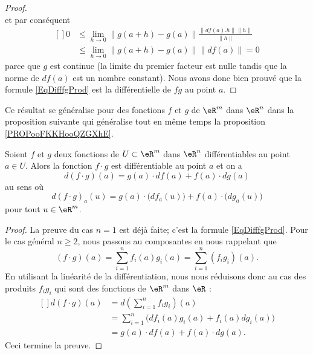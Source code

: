 \begin{proof}
\begin{equation}
	\end{equation}
	et par conséquent
	\begin{equation}
		\begin{aligned}[]
			0 & \leq\lim_{h\to 0} \| g(a+h)-g(a) \|\frac{ \| df(a).h \|\| h \| }{ \| h \| } \\
			  & \leq \lim_{h\to 0} \| g(a+h)-g(a) \|\| df(a) \|=0
		\end{aligned}
	\end{equation}
	parce que \( g\) est continue (la limite du premier facteur est nulle tandis que la norme de \( df(a)\) est un nombre constant). Nous avons donc bien prouvé que la formule \eqref{EqDifffgProd} est la différentielle de \( fg\) au point \( a\).
\end{proof}


Ce résultat se généralise pour des fonctions \( f\) et \( g\) de \( \eR^m\) dans \( \eR^n\) dans la proposition suivante qui généralise tout en même temps la proposition \ref{PROPooFKKHooQZGXhE}.
\begin{proposition}
	Soient \( f\) et \( g\) deux fonctions de \( U\subset\eR^m\) dans \( \eR^n\) différentiables au point \( a\in U\). Alors la fonction \( f\cdot g\) est différentiable  au point \( a\) et on a
	\begin{equation}
		d(f\cdot g)(a)=g(a)\cdot df(a)+f(a)\cdot dg(a)
	\end{equation}
	au sens où
	\begin{equation}		\label{Eqdfcdotgexpl}
		d(f\cdot g)_a(u)=g(a)\cdot\big( df_a(u) \big)+f(a)\cdot\big( dg_a(u) \big)
	\end{equation}
	pour tout \( u\in\eR^m\).
\end{proposition}

\begin{proof}
	La preuve du cas \( n=1\) est déjà faite; c'est la formule \eqref{EqDifffgProd}. Pour le cas général \( n\geq 2\), nous passons au composantes en nous rappelant que
	\begin{equation}
		(f\cdot g)(a)=\sum_{i=1}^nf_i(a)g_i(a)=\sum_{i=1}^n(f_ig_i)(a).
	\end{equation}
	En utilisant la linéarité de la différentiation, nous nous réduisons donc au cas des produits \( f_ig_i\) qui sont des fonctions de \( \eR^m\) dans \( \eR\) :
	\begin{equation}
		\begin{aligned}[]
			d(f\cdot g)(a) & =d\left( \sum_{i=1}^n f_ig_i \right)(a)              \\
			               & =\sum_{i=1}^n\big( df_i(a)g_i(a)+f_i(a)dg_i(a) \big) \\
			               & =g(a)\cdot df(a)+f(a)\cdot dg(a).
		\end{aligned}
	\end{equation}
	Ceci termine la preuve.
\end{proof}

